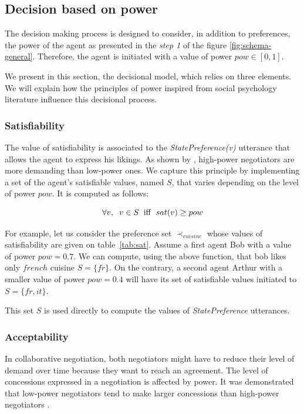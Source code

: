 \documentclass[conference, letterpaper]{IEEEtran}
\begin{document}
	
	\subsection{Decision based on power}
	\label{sec:dec}
	The decision making process is designed to consider, in addition to preferences, the power of the agent as presented in the \textit{step 1} of the figure \ref{fig:schema-general}. 
	Therefore, the agent is initiated with a value of power $pow \in [0,1]$. 
	
	We present in this section, the decisional model, which relies on three elements. We will explain how the principles of power inspired from social psychology literature influence this decisional process.

	
	\subsubsection{Satisfiability}
	\label{sec:sat}
	The value of satisfiability is associated to the \emph{StatePreference(v)} utterance that allows the agent to express his likings. As shown by \cite{de1995impact}, high-power negotiators are more demanding than low-power ones.
	We capture this principle by implementing a set of the agent's satisfiable values, named $S$, that varies depending on the level of power $pow$. It is computed as follows:

	\begin{equation}
		\forall v,\hspace{2mm} v\in S\hspace{2mm}\mathrm{iff}\hspace{2mm}sat(v) \geq pow
	\end{equation}
	
	For example, let us consider the preference set $\prec_{cuisine}$ whose values of satisfiability are given on table~\ref{tab:sat}. Assume a first agent Bob with a value of power $pow = 0.7$. We can compute, using the above function, that bob likes only $french$ cuisine $S= \{fr\}$. On the contrary, a second agent Arthur with a smaller value of power $pow=0.4$ will have its set of satisfiable values initiated to $S= \{fr, it\}$. 
	
    This set $S$ is used directly to compute the values of \emph{StatePreference} utterances.
	
	\subsubsection{Acceptability}
	\label{sec:acc}
	In collaborative negotiation, both negotiators might have to reduce their level of demand over time because they want to reach an agreement. The level of concessions expressed in a negotiation is affected by power. It was demonstrated that low-power negotiators tend to make larger concessions than high-power negotiators \cite{de1995impact}.
	
\end{document}
